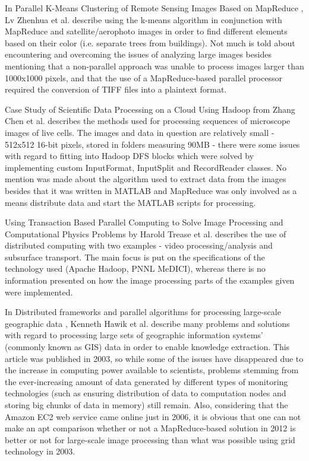 \documentclass [12pt,a4paper]{report}
\begin{document}
In Parallel K-Means Clustering of Remote Sensing Images Based on MapReduce \cite{Lv:2010:PKC:1927661.1927687}, Lv Zhenhua et al. describe using the k-means algorithm in conjunction with MapReduce and satellite/aerophoto images in order to find different elements based on their color (i.e. separate trees from buildings). Not much is told about encountering and overcoming the issues of analyzing large images besides mentioning that a non-parallel approach was unable to process images larger than 1000x1000 pixels, and that the use of a MapReduce-based parallel processor required the conversion of TIFF files into a plaintext format.

Case Study of Scientific Data Processing on a Cloud Using Hadoop \cite{Zhang:2009:CSS:2127968.2128002} from Zhang Chen et al. describes the methods used for processing sequences of microscope images of live cells. The images and data in question are relatively small - 512x512 16-bit pixels, stored in folders measuring 90MB - there were some issues with regard to fitting into Hadoop DFS blocks which were solved by implementing custom InputFormat, InputSplit and RecordReader classes. No mention was made about the algorithm used to extract data from the images besides that it was written in MATLAB and MapReduce was only involved as a means distribute data and start the MATLAB scripts for processing.

Using Transaction Based Parallel Computing to Solve Image Processing and Computational Physics Problems \cite{trease08} by Harold Trease et al. describes the use of distributed computing with two examples - video processing/analysis and subsurface transport. The main focus is put on the specifications of the technology used (Apache Hadoop, PNNL MeDICI), whereas there is no information presented on how the image processing parts of the examples given were implemented.

In Distributed frameworks and parallel algorithms for processing large-scale geographic data \cite{Hawick:2003:DFP:958021.958024}, Kenneth Hawik et al. describe many problems and solutions with regard to processing large sets of geographic information systems' (commonly known as GIS) data in order to enable knowledge extraction. This article was published in 2003, so while some of the issues have disappeared due to the increase in computing power available to scientists, problems stemming from the ever-increasing amount of data generated by different types of monitoring technologies (such as ensuring distribution of data to computation nodes and storing big chunks of data in memory) still remain. Also, considering that the Amazon EC2 \cite{website:amazon_ec2} web service came online just in 2006, it is obvious that one can not make an apt comparison whether or not a MapReduce-based solution in 2012 is better or not for large-scale image processing than what was possible using grid technology in 2003.
\end{document}
